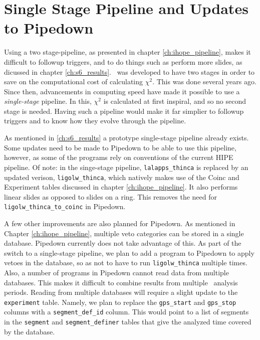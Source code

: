 \section{Single Stage Pipeline and Updates to Pipedown}

Using a two stage-pipeline, as presented in chapter \ref{ch:ihope_pipeline},
makes it difficult to followup triggers, and to do things such as perform more
slides, as dicussed in chapter \ref{ch:s6_results}. \hipe~was developed to have
two stages in order to save on the computational cost of calculating $\chi^2$.
This was done several years ago. Since then, advancements in computing speed
have made it possible to use a \emph{single-stage} pipeline. In this, $\chi^2$
is calculated at first inspiral, and so no second stage is needed. Having such
a pipeline would make it far simplier to followup triggers and to know how they
evolve through the pipeline.

As mentioned in \ref{ch:s6_results} a prototype single-stage pipeline already
exists. Some updates need to be made to Pipedown to be able to use this
pipeline, however, as some of the programs rely on conventions of the current
\ac{HIPE} pipeline. Of note: in the singe-stage pipeline, \verb|lalapps_thinca|
is replaced by an updated verison, \verb|ligolw_thinca|, which natively makes
use of the Coinc and Experiment tables discussed in chapter
\ref{ch:ihope_pipeline}. It also performs linear slides as opposed to slides on
a ring. This removes the need for \verb|ligolw_thinca_to_coinc| in Pipedown.

A few other improvements are also planned for Pipedown. As mentioned in Chapter
\ref{ch:ihope_pipeline}, multiple veto categories can be stored in a single
database. Pipedown currently does not take advantage of this. As part of the
switch to a single-stage pipeline, we plan to add a program to Pipedown to
apply vetoes in the database, so as not to have to run \verb|ligolw_thinca|
multiple times. Also, a number of programs in Pipedown cannot read data from
multiple databases. This makes it difficult to combine results from multiple
\ihope~analysis periods. Reading from multiple databases will require a slight
update to the \verb|experiment| table. Namely, we plan to replace the
\verb|gps_start| and \verb|gps_stop| columns with a \verb|segment_def_id|
column. This would point to a list of segments in the \verb|segment| and
\verb|segment_definer| tables that give the analyzed time covered by the
database.

